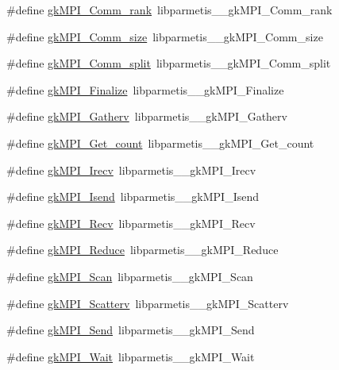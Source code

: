\begin{DoxyCompactItemize}
\item 
\#define \hyperlink{a00960_a4e3d8ae0267be0be3ad2b96ec062b62a}{gk\+M\+P\+I\+\_\+\+Comm\+\_\+rank}~libparmetis\+\_\+\+\_\+gk\+M\+P\+I\+\_\+\+Comm\+\_\+rank
\item 
\#define \hyperlink{a00960_a0d220ff05dd391eda40a00f63669aec3}{gk\+M\+P\+I\+\_\+\+Comm\+\_\+size}~libparmetis\+\_\+\+\_\+gk\+M\+P\+I\+\_\+\+Comm\+\_\+size
\item 
\#define \hyperlink{a00960_ab8ef4e6c5dc53d459115c3bd0ac8865b}{gk\+M\+P\+I\+\_\+\+Comm\+\_\+split}~libparmetis\+\_\+\+\_\+gk\+M\+P\+I\+\_\+\+Comm\+\_\+split
\item 
\#define \hyperlink{a00960_a5ef315d1a7be635f31a4c8c98e86f2c7}{gk\+M\+P\+I\+\_\+\+Finalize}~libparmetis\+\_\+\+\_\+gk\+M\+P\+I\+\_\+\+Finalize
\item 
\#define \hyperlink{a00960_ae80592cad522db856a9c28fbeefa4d6c}{gk\+M\+P\+I\+\_\+\+Gatherv}~libparmetis\+\_\+\+\_\+gk\+M\+P\+I\+\_\+\+Gatherv
\item 
\#define \hyperlink{a00960_a4822ad16b4cbcb8107763b34b2fb2e69}{gk\+M\+P\+I\+\_\+\+Get\+\_\+count}~libparmetis\+\_\+\+\_\+gk\+M\+P\+I\+\_\+\+Get\+\_\+count
\item 
\#define \hyperlink{a00960_a1a3bcace6215e96dde4452ae98c79d03}{gk\+M\+P\+I\+\_\+\+Irecv}~libparmetis\+\_\+\+\_\+gk\+M\+P\+I\+\_\+\+Irecv
\item 
\#define \hyperlink{a00960_afc0d9583336332790d902e69df6a7452}{gk\+M\+P\+I\+\_\+\+Isend}~libparmetis\+\_\+\+\_\+gk\+M\+P\+I\+\_\+\+Isend
\item 
\#define \hyperlink{a00960_a03afdb8ca5bf59f4f34c202db3119a2d}{gk\+M\+P\+I\+\_\+\+Recv}~libparmetis\+\_\+\+\_\+gk\+M\+P\+I\+\_\+\+Recv
\item 
\#define \hyperlink{a00960_a24680be0235bbd85b40700f017e178ea}{gk\+M\+P\+I\+\_\+\+Reduce}~libparmetis\+\_\+\+\_\+gk\+M\+P\+I\+\_\+\+Reduce
\item 
\#define \hyperlink{a00960_a9edf290733dd4cd8dfa027ff593f6237}{gk\+M\+P\+I\+\_\+\+Scan}~libparmetis\+\_\+\+\_\+gk\+M\+P\+I\+\_\+\+Scan
\item 
\#define \hyperlink{a00960_ab86dc62cac3e85334e1c40246344d010}{gk\+M\+P\+I\+\_\+\+Scatterv}~libparmetis\+\_\+\+\_\+gk\+M\+P\+I\+\_\+\+Scatterv
\item 
\#define \hyperlink{a00960_a9502aa95f137314e1a9c516d71c6dcdc}{gk\+M\+P\+I\+\_\+\+Send}~libparmetis\+\_\+\+\_\+gk\+M\+P\+I\+\_\+\+Send
\item 
\#define \hyperlink{a00960_a7d11c92de920059b77284256c9e95bed}{gk\+M\+P\+I\+\_\+\+Wait}~libparmetis\+\_\+\+\_\+gk\+M\+P\+I\+\_\+\+Wait

\end{DoxyCompactItemize}
